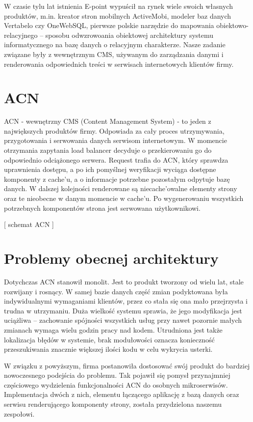 \documentclass[licencjacka]{pracamgr}
\begin{document}
W czasie tylu lat istnienia E-point wypuścił na rynek wiele swoich własnych produktów, m.in. kreator stron mobilnych ActiveMobi, modeler baz danych Vertabelo czy OneWebSQL, pierwsze polskie narzędzie do mapowania obiektowo-relacyjnego – sposobu odwzrowoania obiektowej architektury systemu informatycznego na bazę danych o relacyjnym charakterze. Nasze zadanie związane były z wewnętrznym CMS, używanym do zarządzania danymi i renderowania odpowiednich treści w serwisach internetowych klientów firmy.

\section{ACN}

ACN - wewnętrzny CMS (Content Management System) - to jeden z największych produktów firmy. Odpowiada za cały proces utrzymywania, przygotowania i serwowania danych serwisom internetowym. W momencie otrzymania zapytania load balancer decyduje o przekierowaniu go do odpowiednio odciążonego serwera. Request trafia do ACN, który sprawdza uprawnienia dostępu, a po ich pomyślnej weryfikacji wyciąga dostępne komponenty z cache’u, a o informacje potrzebne pozostałym odpytuje bazę danych. W dalszej kolejności renderowane są niecache’owalne elementy strony oraz te nieobecne w danym momencie w cache’u. Po wygenerowaniu wszystkich potrzebnych komponentów strona jest serwowana użytkownikowi.

\vspace{1mm}

[ schemat ACN ]

\section{Problemy obecnej architektury}
Dotychczas ACN stanowił monolit. Jest to produkt tworzony od wielu lat, stale rozwijany i rosnący. W samej bazie danych część zmian podyktowana była indywidualnymi wymaganiami klientów, przez co stała się ona mało przejrzysta i trudna w utrzymaniu. Duża wielkość systemu sprawia, że jego modyfikacja jest uciążliwa – zachowanie spójności wszystkich usług przy nawet pozornie małych zmianach wymaga wielu godzin pracy nad kodem. Utrudniona jest także lokalizacja błędów w systemie, brak modułowości oznacza konieczność przeszukiwania znacznie większej ilości kodu w celu wykrycia usterki.

\vspace{1mm}

W związku z powyższym, firma postanowiła dostosować swój produkt do bardziej nowoczesnego podejścia do problemu. Tak pojawił się pomysł przynajmniej częściowego wydzielenia funkcjonalności ACN do osobnych mikroserwisów. Implementacja dwóch z nich, elementu łączącego aplikację z bazą danych oraz serwisu renderującego komponenty strony, została przydzielona naszemu zespołowi.
\end{document}
